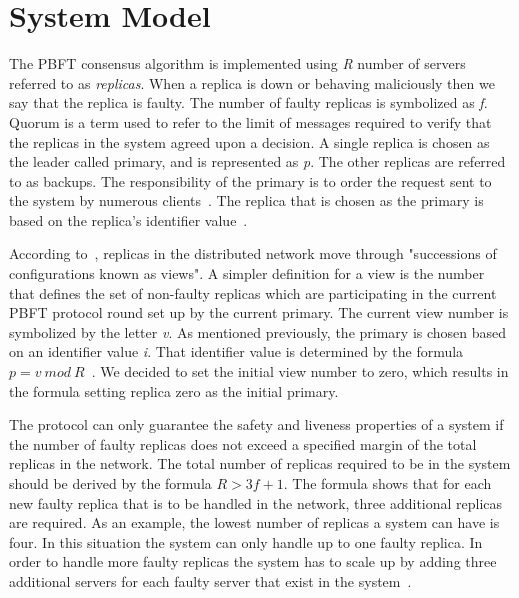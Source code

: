 \section{System Model}
\label{sec:systemModel}
The PBFT consensus algorithm is implemented using \emph{R} number of servers referred to as \emph{replicas}. When a replica is down or behaving maliciously then we say that the replica is faulty. The number of faulty replicas is symbolized as \emph{f}.
Quorum is a term used to refer to the limit of messages required to verify that the replicas in the system agreed upon a decision\cites[p.~408-409]{PAPER:PBFTRecovery}. %
A single replica is chosen as the leader called primary, and is represented as \emph{p}. The other replicas are referred to as backups. The responsibility of the primary is to order the request sent to the system by numerous clients~\cites[p.~456]{BOOK:MVstandver3}[p.~405]{PAPER:PBFTRecovery}. The replica that is chosen as the primary is based on the replica's identifier value~\cite[p.~258]{BOOK:BuildDepDistSyst}.

According to~\cites[p.~3]{PAPER:OGPBFT}[p.~405]{PAPER:PBFTRecovery}, replicas in the distributed network move through "successions of configurations known as views". A simpler definition for a view is the number that defines the set of non-faulty replicas which are participating in the current PBFT protocol round set up by the current primary. The current view number is symbolized by the letter \emph{v}.
As mentioned previously, the primary is chosen based on an identifier value \emph{i}. That identifier value is determined by the formula $p = v ~mod~ R$~\cites[p.~258]{BOOK:BuildDepDistSyst}[p.~3]{PAPER:OGPBFT}{SLIDES:PBFT}.
We decided to set the initial view number to zero, which results in the formula setting replica zero as the initial primary.

The protocol can only guarantee the safety and liveness properties of a system if the number of faulty replicas does not exceed a specified margin of the total replicas in the network. The total number of replicas required to be in the system should be derived by the formula $R > 3f + 1$.
The formula shows that for each new faulty replica that is to be handled in the network, three additional replicas are required. As an example, the lowest number of replicas a system can have is four. In this situation the system can only handle up to one faulty replica. In order to handle more faulty replicas the system has to scale up by adding three additional servers for each faulty server that exist in the system~\cites[p.~257]{BOOK:BuildDepDistSyst}[p.~403]{PAPER:PBFTRecovery}{SLIDES:PBFT}[p.~3]{PAPER:OGPBFT}.

